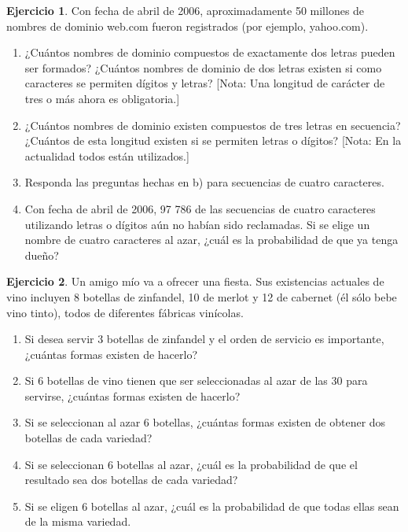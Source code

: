 \documentclass[
  11pt,
]{book}
\theoremstyle{definition}
\theoremstyle{definition}
\theoremstyle{definition}
\newtheorem{exercise}{Ejercicio}[chapter]
\theoremstyle{definition}
\theoremstyle{remark}
\begin{document}
\begin{exercise}

Con fecha de abril de 2006, aproximadamente 50 millones de nombres de dominio web.com fueron registrados (por ejemplo, yahoo.com).

\begin{enumerate}
\def\labelenumi{\alph{enumi}.}
\item
  ¿Cuántos nombres de dominio compuestos de exactamente dos letras pueden ser formados? ¿Cuántos nombres de dominio de dos letras existen si como caracteres se permiten dígitos y letras? {[}Nota: Una longitud de carácter de tres o más ahora es obligatoria.{]}
\item
  ¿Cuántos nombres de dominio existen compuestos de tres letras en secuencia? ¿Cuántos de esta longitud existen si se permiten letras o dígitos? {[}Nota: En la actualidad todos están utilizados.{]}
\item
  Responda las preguntas hechas en b) para secuencias de cuatro caracteres.
\item
  Con fecha de abril de 2006, 97 786 de las secuencias de cuatro caracteres utilizando letras o dígitos aún no habían sido reclamadas. Si se elige un nombre de cuatro caracteres al azar, ¿cuál es la probabilidad de que ya tenga dueño?\\
\end{enumerate}

\end{exercise}

\begin{exercise}

Un amigo mío va a ofrecer una fiesta. Sus existencias actuales de vino incluyen 8 botellas de zinfandel, 10 de merlot y 12 de cabernet (él sólo bebe vino tinto), todos de diferentes fábricas vinícolas.

\begin{enumerate}
\def\labelenumi{\alph{enumi}.}
\item
  Si desea servir 3 botellas de zinfandel y el orden de servicio es importante, ¿cuántas formas existen de hacerlo?
\item
  Si 6 botellas de vino tienen que ser seleccionadas al azar de las 30 para servirse, ¿cuántas formas existen de hacerlo?
\item
  Si se seleccionan al azar 6 botellas, ¿cuántas formas existen de obtener dos botellas de cada variedad?
\item
  Si se seleccionan 6 botellas al azar, ¿cuál es la probabilidad de que el resultado sea dos botellas de cada variedad?
\item
  Si se eligen 6 botellas al azar, ¿cuál es la probabilidad de que todas ellas sean de la misma variedad.
\end{enumerate}

\end{exercise}
\end{document}
